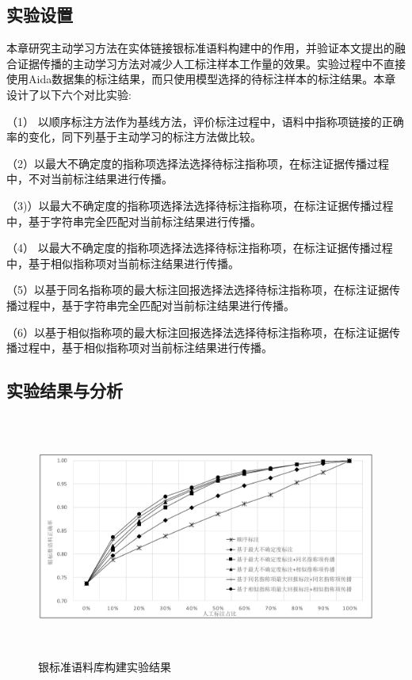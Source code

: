 \subsection{实验设置}\label{section:anno_set}
本章研究主动学习方法在实体链接银标准语料构建中的作用，并验证本文提出的融合证据传播的主动学习方法对减少人工标注样本工作量的效果。实验过程中不直接使用Aida数据集的标注结果，而只使用模型选择的待标注样本的标注结果。本章设计了以下六个对比实验:

（1） 以顺序标注方法作为基线方法，评价标注过程中，语料中指称项链接的正确率的变化，同下列基于主动学习的标注方法做比较。

（2）以最大不确定度的指称项选择法选择待标注指称项，在标注证据传播过程中，不对当前标注结果进行传播。

（3)）以最大不确定度的指称项选择法选择待标注指称项，在标注证据传播过程中，基于字符串完全匹配对当前标注结果进行传播。

（4） 以最大不确定度的指称项选择法选择待标注指称项，在标注证据传播过程中，基于相似指称项对当前标注结果进行传播。

（5）以基于同名指称项的最大标注回报选择法选择待标注指称项，在标注证据传播过程中，基于字符串完全匹配对当前标注结果进行传播。

（6）以基于相似指称项的最大标注回报选择法选择待标注指称项，在标注证据传播过程中，基于相似指称项对当前标注结果进行传播。

\subsection{实验结果与分析}
\begin{figure}[!htb]
	\centering\includegraphics[height=8cm]{resource/anno_result}
	\caption{银标准语料库构建实验结果}
	\label{fig:anno_result}
\end{figure}

